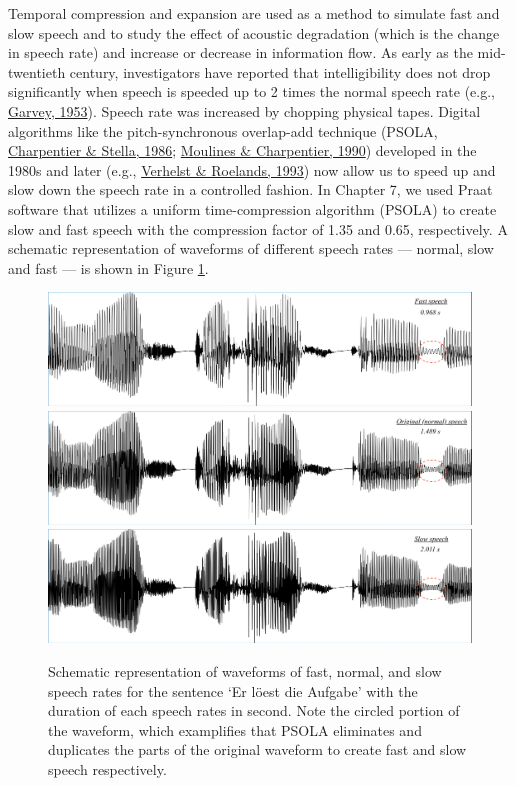 \documentclass[a4paper, nobind]{templates/ociamthesis}
\begin{document}
Temporal compression and expansion are used as a method to simulate fast and slow speech and
to study the effect of acoustic degradation (which is the change in speech rate) and increase or decrease in information flow.
As early as the mid-twentieth century, investigators have reported that intelligibility does not drop significantly when speech is speeded up to 2 times the normal speech rate (e.g., \protect\hyperlink{ref-Garvey1953}{Garvey, 1953}).
Speech rate was increased by chopping physical tapes.
Digital algorithms like the pitch-synchronous overlap-add technique (PSOLA, \protect\hyperlink{ref-Charpentier1986}{Charpentier \& Stella, 1986}; \protect\hyperlink{ref-Moulines1990}{Moulines \& Charpentier, 1990}) developed in the 1980s and later (e.g., \protect\hyperlink{ref-Verhelst1993}{Verhelst \& Roelands, 1993}) now allow us to speed up and slow down the speech rate in a controlled fashion.
In Chapter 7, we used Praat software that utilizes a uniform time-compression algorithm (PSOLA) to create slow and fast speech with the compression factor of 1.35 and 0.65, respectively.
A schematic representation of waveforms of different speech rates --- normal, slow and fast --- is shown in Figure \ref{fig:speech-rate}.

\begin{figure}[!htpb]

{\centering \includegraphics[width=0.9\linewidth]{figures/materials/aufgabe_fast} \includegraphics[width=0.9\linewidth]{figures/materials/aufgabe_normal} \includegraphics[width=0.9\linewidth]{figures/materials/aufgabe_slow} 

}

\caption{Schematic representation of waveforms of fast, normal, and slow speech rates for the sentence `Er löest die Aufgabe' with the duration of each speech rates in second. Note the circled portion of the waveform, which examplifies that PSOLA eliminates and duplicates the parts of the original waveform to create fast and slow speech respectively.}\label{fig:speech-rate}
\end{figure}
\end{document}
